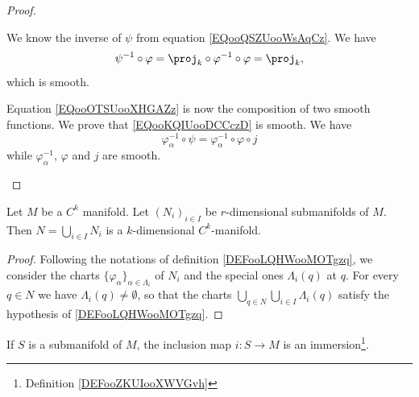 \begin{proof}
\begin{subproof}
		We know the inverse of \( \psi\) from equation \eqref{EQooQSZUooWsAqCz}. We have
		\begin{equation}
			\psi^{-1}\circ\varphi=\proj_k\circ\varphi^{-1}\circ\varphi=\proj_k,
		\end{equation}
		which is smooth.

		Equation \eqref{EQooOTSUooXHGAZz} is now the composition of two smooth functions.
		We prove that \eqref{EQooKQIUooDCCczD} is smooth. We have
		\begin{equation}
			\varphi_{\alpha}^{-1}\circ\psi=\varphi_{\alpha}^{-1}\circ\varphi\circ j
		\end{equation}
		while \( \varphi_{\alpha}^{-1}\), \( \varphi\) and \( j\) are smooth.
	\end{subproof}
\end{proof}

\begin{proposition}	\label{PROPooFFDYooLmwISw}
	Let \( M\) be a \( C^k\) manifold. Let \( (N_i)_{i\in I}\) be \( r\)-dimensional submanifolds of \( M\). Then \( N=\bigcup_{i\in I}N_i\) is a \( k\)-dimensional \( C^k\)-manifold.
\end{proposition}

\begin{proof}
	Following the notations of definition \ref{DEFooLQHWooMOTgzq}, we consider the charts \( \{ \varphi_{\alpha} \}_{\alpha\in\Lambda_i}\) of \( N_i\) and the special ones \( \Lambda_i(q)\) at \( q\). For every \( q\in N\) we have \( \Lambda_i(q)\neq \emptyset\), so that the charts \( \bigcup_{q\in N}\bigcup_{i\in I}\Lambda_i(q)\) satisfy the hypothesis of \ref{DEFooLQHWooMOTgzq}.
\end{proof}



\begin{proposition}       \label{PROPooEWUCooTStAvb}
	If \( S\) is a submanifold of \( M\), the inclusion map \( i\colon S \to M\) is an immersion\footnote{Definition \ref{DEFooZKUIooXWVGvh}}.
\end{proposition}

